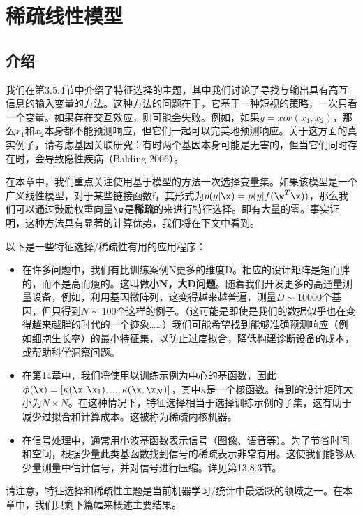 \documentclass[a4paper]{article}
\begin{document}
\clearpage
\section{稀疏线性模型 }
\subsection{介绍}
我们在第3.5.4节中介绍了特征选择的主题，其中我们讨论了寻找与输出具有高互信息的输入变量的方法。这种方法的问题在于，它基于一种短视的策略，一次只看一个变量。如果存在交互效应，则可能会失败。例如，如果$y=xor(x_1,x_2)$，那么$x_1$和$x_2$本身都不能预测响应，但它们一起可以完美地预测响应。关于这方面的真实例子，请考虑基因关联研究：有时两个基因本身可能是无害的，但当它们同时存在时，会导致隐性疾病（Balding 2006）。 

在本章中，我们重点关注使用基于模型的方法一次选择变量集。如果该模型是一个广义线性模型，对于某些链接函数f，其形式为$p(y|\x)=p(y|f(\w^T\x))$，那么我们可以通过鼓励权重向量$\w$是\textbf{稀疏}的来进行特征选择。即有大量的零。事实证明，这种方法具有显著的计算优势，我们将在下文中看到。 

以下是一些特征选择/稀疏性有用的应用程序： 
\begin{itemize}
\item 在许多问题中，我们有比训练案例N更多的维度D。相应的设计矩阵是短而胖的，而不是高而瘦的。这叫做\textbf{小N，大D问题}。随着我们开发更多的高通量测量设备，例如，利用基因微阵列，这变得越来越普遍，测量$D\sim 10000$个基因，但只得到$N\sim 100$个这样的例子。（这可能是即使是我们的数据似乎也在变得越来越胖的时代的一个迹象……）我们可能希望找到能够准确预测响应（例如细胞生长率）的最小特征集，以防止过度拟合，降低构建诊断设备的成本，或帮助科学洞察问题。 
\item  在第14章中，我们将使用以训练示例为中心的基函数，因此$\boldsymbol{\phi}(\x)=[\kappa (\x,\x_1),...,\kappa(\x,\x_N)]$，其中$\kappa$是一个核函数。得到的设计矩阵大小为$N\times N$。在这种情况下，特征选择相当于选择训练示例的子集，这有助于减少过拟合和计算成本。这被称为稀疏内核机器。 
\item 在信号处理中，通常用小波基函数表示信号（图像、语音等）。为了节省时间和空间，根据少量此类基函数找到信号的稀疏表示非常有用。这使我们能够从少量测量中估计信号，并对信号进行压缩。详见第13.8.3节。 
\end{itemize}

请注意，特征选择和稀疏性主题是当前机器学习/统计中最活跃的领域之一。在本章中，我们只剩下篇幅来概述主要结果。
\end{document}
